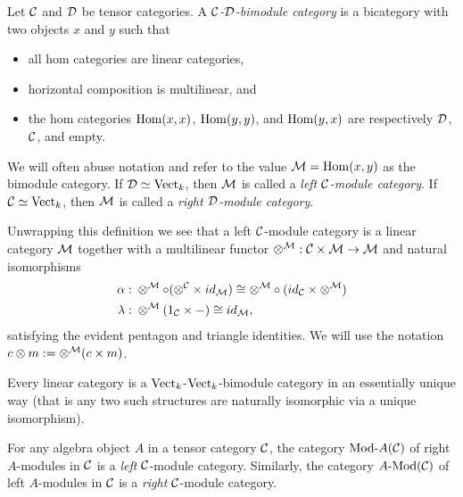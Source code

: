 \documentclass{amsart}
\begin{document}
\begin{definition}
	Let $\mathcal C$ and $\mathcal D$ be tensor categories. A {\em $\mathcal C$-$\mathcal D$-bimodule category} is a bicategory with two objects $x$ and $y$ such that
	\begin{itemize}
		\item all hom categories are linear categories, 
		\item horizontal composition is multilinear, and
		\item the hom categories $\operatorname{Hom}(x,x)$, $\operatorname{Hom}(y,y)$, and $\operatorname{Hom}(y,x)$ are respectively $\mathcal D$, $\mathcal C$, and empty.
	\end{itemize}
	We will often abuse notation and refer to the value $\mathcal M = \operatorname{Hom}(x,y)$ as the bimodule category. If $\mathcal D \simeq \mathrm{Vect}_k$, then $\mathcal M$ is called a {\em left $\mathcal C$-module category}. If $\mathcal C \simeq \mathrm{Vect}_k$, then $\mathcal M$ is called a {\em right $\mathcal D$-module category}.
\end{definition}
	
Unwrapping this definition we see that a left $\mathcal C$-module category is a linear category $\mathcal M$ together with a multilinear functor $\otimes^{\mathcal M}: \mathcal C \times \mathcal M \to \mathcal M$ and natural isomorphisms
	\begin{align*}
		\alpha: & \;    \otimes^{\mathcal M} \circ (\otimes^{\mathcal C} \times id_{\mathcal M}) \cong  \otimes^{\mathcal M} \circ (id_{\mathcal C} \times \otimes^{\mathcal M}) \\
		\lambda: & \; \otimes^{\mathcal M}(1_{\mathcal C} \times -) \cong id_{\mathcal M},
	\end{align*}
	satisfying the evident pentagon and triangle identities.  We will use the notation $c \otimes m := \otimes^\mathcal M(c \times m)$.

\begin{example}
	Every linear category is a $\mathrm{Vect}_k$-$\mathrm{Vect}_k$-bimodule category in an essentially unique way (that is any two such structures are naturally isomorphic via a unique isomorphism). %
\end{example}

\begin{example} \label{ex:ModulesAreModules}
	For any algebra object $A$ in a tensor category $\mathcal C$, the category $\Mod{}{A}(\cC)$ of right $A$-modules in $\mathcal C$ is a \emph{left} $\mathcal C$-module category.  Similarly, the category $\Mod{A}{}(\cC)$ of left $A$-modules in $\mathcal C$ is a \emph{right} $\mathcal C$-module category.
\end{example}  
\end{document}
